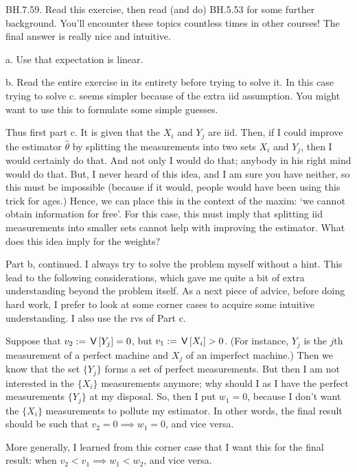 \begin{exercise}
BH.7.59.
Read this exercise, then read (and do) BH.5.53 for some further background.
You'll encounter these topics countless times in other courses!
The final answer is really nice and intuitive.

\begin{hint}
a. Use that expectation is linear.

b. Read the entire exercise in its entirety before trying to solve it. In this case trying to solve c.\/ seems simpler because of the extra iid assumption. You  might want to use this to formulate some simple guesses.

Thus first part c. It is given that the $X_i$ and $Y_j$ are iid. Then, if I could improve the estimator $\hat \theta$ by splitting the measurements into two sets $X_i$ and $Y_j$, then I would certainly do that.
And not only I would do that; anybody in his right mind would do that.
But, I never heard of this idea, and I am sure you have neither, so this must be impossible (because if it would, people would have been using this trick for ages.)
Hence, we can place this in the context of the maxim: `we cannot obtain information for free'.
For this case, this must imply that splitting iid measurements into smaller sets cannot help with improving the estimator. What does this idea imply for the weights?


Part b, continued. I always try to solve the problem myself without a hint. This lead to the following considerations, which gave me quite a bit of extra understanding beyond the problem itself.  As a next piece of advice, before doing hard work, I prefer to look at some corner cases to acquire some intuitive understanding. I also use the rvs of Part c.

Suppose  that $v_2:=\,\mathsf{V}\left[Y_j\right] = 0$, but $v_1 := \,\mathsf{V}\left[X_i\right] > 0$. (For instance, $Y_j$ is the $j$th measurement of a perfect machine and $X_j$ of an imperfect machine.)
Then we know that the set $\{Y_j\}$ forms a set of perfect measurements.
But then I am not interested in the $\{X_i\}$ measurements anymore; why should I as I have the perfect measurements $\{Y_j\}$ at my disposal.
So, then I put $w_1=0$, because I don't want the $\{X_i\}$ measurements to pollute my estimator.
In other words, the final result should be such that $v_2=0 \implies w_{1}=0$, and vice versa.


More generally, I learned from this  corner case that I want this for the final result:  when $v_2<v_{1} \implies w_1 < w_{2}$, and vice versa.


\end{hint}
\end{exercise}

